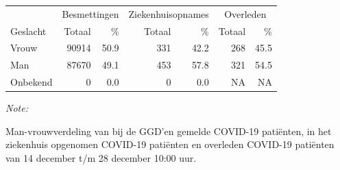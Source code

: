 \documentclass[
  english,
  man,floatsintext]{apa6}
\begin{document}
\begin{table}
\centering\begingroup\fontsize{11}{13}\selectfont

\begin{threeparttable}
\begin{tabular}{lrrrrrr}
\toprule
\multicolumn{1}{c}{ } & \multicolumn{2}{c}{Besmettingen} & \multicolumn{2}{c}{Ziekenhuisopnames} & \multicolumn{2}{c}{Overleden} \\
\cmidrule(l{3pt}r{3pt}){2-3} \cmidrule(l{3pt}r{3pt}){4-5} \cmidrule(l{3pt}r{3pt}){6-7}
Geslacht & Totaal & \% & Totaal & \% & Totaal & \%\\
\midrule
Vrouw & 90914 & 50.9 & 331 & 42.2 & 268 & 45.5\\
Man & 87670 & 49.1 & 453 & 57.8 & 321 & 54.5\\
Onbekend & 0 & 0.0 & 0 & 0.0 & NA & NA\\
\bottomrule
\end{tabular}
\begin{tablenotes}
\item \textit{Note: } 
\item Man-vrouwverdeling van bij de GGD’en gemelde COVID-19 patiënten, in het ziekenhuis opgenomen COVID-19 patiënten en overleden COVID-19 patiënten van 14 december t/m 28 december 10:00 uur.
\end{tablenotes}
\end{threeparttable}
\endgroup{}
\end{table}
\newpage
\end{document}
